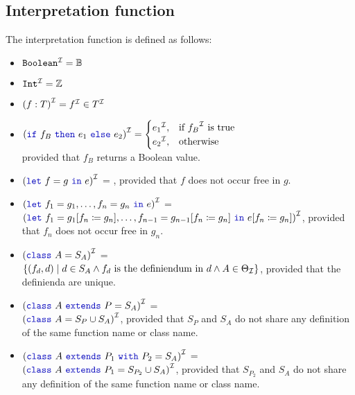 \subsection{Interpretation function}

The interpretation function is defined as follows:
\begin{itemize}
    \item ${\texttt{{Boolean}}}^{\mathcal{I}} = \mathbb{B}$
    \item ${\texttt{{Int}}}^{\mathcal{I}} = \mathbb{Z}$

    \item ${(f : T)}^{\mathcal{I}} = {f}^{\mathcal{I}} \in {T}^{\mathcal{I}}$

    \item $\I{(\sodaif\ f_{B} \ \sodathen\ e_{1} \ \sodaelse\ e_{2})} =
    \begin{cases}
        \I{e_{1}}, & \text{if } \I{f_{B}} \text{ is true }\\
        \I{e_{2}}, & \text{otherwise}
    \end{cases}
    $\\
    provided that $f_{B}$ returns a Boolean value.

    \item $\I{(\sodalet\ f = g \ \sodain\ e)}$ =
    , provided that $f$ does not occur free in $g$.

    \item $\I{(\sodalet\ f_{1} = g_{1}, \ldots , f_{n} = g_{n} \ \sodain\ e)}$ = \\
    $\I{(\sodalet\ f_{1} = g_{1}[f_{n} \coloneqq g_{n}], \ldots , f_{n - 1} = g_{n - 1}[f_{n} \coloneqq g_{n}] \ \sodain\ e[f_{n} \coloneqq g_{n}])}$, provided that $f_{n}$ does not occur free in $g_{n}$.

    \item $\I{(\sodaclass\ A = S_{A})}$ = \\
    $\{ (f_{d}, d) \mid d \in S_{A} \land f_{d} \text{ is the definiendum in } d \land A \in \Theta _{\mathcal{I}} \}$, provided that the definienda are unique.

    \item $\I{(\sodaclass\ A \ \sodaextends\ P = S_{A})}$ = \\
    $\I{(\sodaclass\ A = S_{P} \cup S_{A})}$, provided that $S_{P}$ and $S_{A}$ do not share any definition of the same function name or class name.

    \item $\I{(\sodaclass\ A \ \sodaextends\ P_{1} \ \sodawith\ P_{2} = S_{A})}$ = \\
    $\I{(\sodaclass\ A \ \sodaextends\ P_{1} = S_{P_{2}} \cup S_{A})}$, provided that $S_{P_{2}}$ and $S_{A}$ do not share any definition of the same function name or class name.

\end{itemize}

